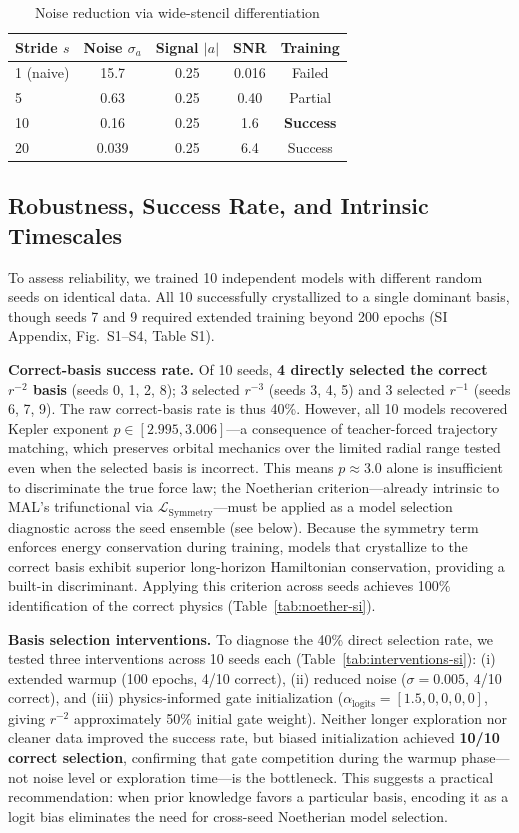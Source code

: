 \documentclass[9pt,twocolumn,twoside]{pnas-new}
\begin{document}
\begin{table}[!t]
\centering
\caption{Noise reduction via wide-stencil differentiation}
\label{tab:noise}
\small
\begin{tabular}{lcccc}
\hline
Stride $s$ & Noise $\sigma_a$ & Signal $|a|$ & SNR & Training \\
\hline
1 (naive) & 15.7 & 0.25 & 0.016 & Failed \\
5 & 0.63 & 0.25 & 0.40 & Partial \\
10 & 0.16 & 0.25 & 1.6 & \textbf{Success} \\
20 & 0.039 & 0.25 & 6.4 & Success \\
\hline
\end{tabular}
\end{table}

\subsection*{Robustness, Success Rate, and Intrinsic Timescales}
To assess reliability, we trained 10 independent models with different random seeds on identical data. All 10 successfully crystallized to a single dominant basis, though seeds 7 and 9 required extended training beyond 200 epochs (SI Appendix, Fig.~S1--S4, Table S1).

\textbf{Correct-basis success rate.} Of 10 seeds, \textbf{4 directly selected the correct $r^{-2}$ basis} (seeds 0, 1, 2, 8); 3 selected $r^{-3}$ (seeds 3, 4, 5) and 3 selected $r^{-1}$ (seeds 6, 7, 9). The raw correct-basis rate is thus 40\%. However, all 10 models recovered Kepler exponent $p \in [2.995, 3.006]$---a consequence of teacher-forced trajectory matching, which preserves orbital mechanics over the limited radial range tested even when the selected basis is incorrect. This means $p \approx 3.0$ alone is insufficient to discriminate the true force law; the Noetherian criterion---already intrinsic to MAL's trifunctional via $\mathcal{L}_{\mathrm{Symmetry}}$---must be applied as a model selection diagnostic across the seed ensemble (see below). Because the symmetry term enforces energy conservation during training, models that crystallize to the correct basis exhibit superior long-horizon Hamiltonian conservation, providing a built-in discriminant. Applying this criterion across seeds achieves 100\% identification of the correct physics (Table~\ref{tab:noether-si}).

\textbf{Basis selection interventions.} To diagnose the 40\% direct selection rate, we tested three interventions across 10 seeds each (Table~\ref{tab:interventions-si}): (i) extended warmup (100 epochs, 4/10 correct), (ii) reduced noise ($\sigma = 0.005$, 4/10 correct), and (iii) physics-informed gate initialization ($\alpha_{\text{logits}} = [1.5, 0, 0, 0, 0]$, giving $r^{-2}$ approximately 50\% initial gate weight). Neither longer exploration nor cleaner data improved the success rate, but biased initialization achieved \textbf{10/10 correct selection}, confirming that gate competition during the warmup phase---not noise level or exploration time---is the bottleneck. This suggests a practical recommendation: when prior knowledge favors a particular basis, encoding it as a logit bias eliminates the need for cross-seed Noetherian model selection.
\end{document}

